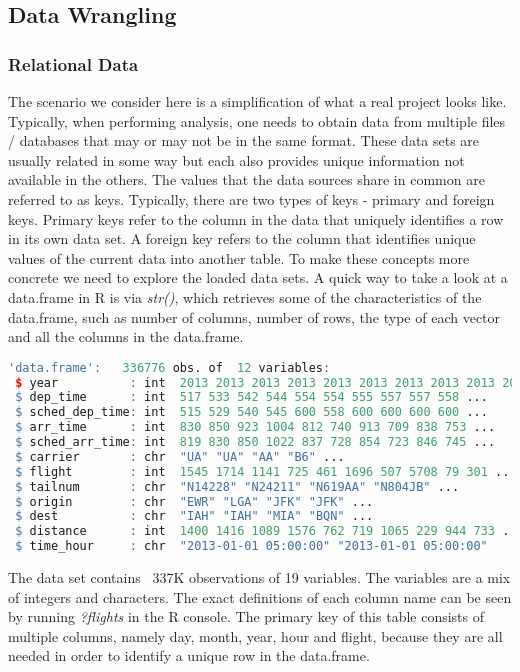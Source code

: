 \subsection{Data Wrangling}
\subsubsection*{Relational Data}
The scenario we consider here is a simplification of what a real project looks like. Typically, when performing analysis, one needs to obtain data from multiple files / databases that may or may not be in the same format. These data sets are usually related in some way but each also provides unique information not available in the others. The values that the data sources share in common are referred to as keys. Typically, there are two types of keys - primary and foreign keys. Primary keys refer to the column in the data that uniquely identifies a row in its own data set. A foreign key refers to the column that identifies unique values of the current data into another table. To make these concepts more concrete we need to explore the loaded data sets. A quick way to take a look at a data.frame in R is via \textit{str()}, which retrieves some of the characteristics of the data.frame, such as number of columns, number of rows, the type of each vector and all the columns in the data.frame.
\begin{lstlisting}[language=R]
'data.frame':	336776 obs. of  12 variables:
 $ year          : int  2013 2013 2013 2013 2013 2013 2013 2013 2013 2013 ...
 $ dep_time      : int  517 533 542 544 554 554 555 557 557 558 ...
 $ sched_dep_time: int  515 529 540 545 600 558 600 600 600 600 ...
 $ arr_time      : int  830 850 923 1004 812 740 913 709 838 753 ...
 $ sched_arr_time: int  819 830 850 1022 837 728 854 723 846 745 ...
 $ carrier       : chr  "UA" "UA" "AA" "B6" ...
 $ flight        : int  1545 1714 1141 725 461 1696 507 5708 79 301 ...
 $ tailnum       : chr  "N14228" "N24211" "N619AA" "N804JB" ...
 $ origin        : chr  "EWR" "LGA" "JFK" "JFK" ...
 $ dest          : chr  "IAH" "IAH" "MIA" "BQN" ...
 $ distance      : int  1400 1416 1089 1576 762 719 1065 229 944 733 ...
 $ time_hour     : chr  "2013-01-01 05:00:00" "2013-01-01 05:00:00"
\end{lstlisting}
The data set contains ~337K observations of 19 variables. The variables are a mix of integers and characters. The exact definitions of each column name can be seen by running \textit{?flights} in the R console. The primary key of this table consists of multiple columns, namely day, month, year, hour and flight, because they are all needed in order to identify a unique row in the data.frame.


